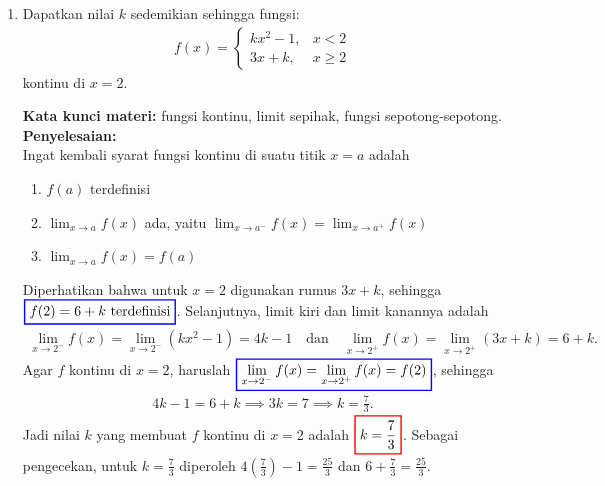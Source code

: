 \documentclass[10pt,openany,a4paper]{article}
\theoremstyle{definition}
\theoremstyle{definition}
\theoremstyle{plain}
\newenvironment{jawab}[2][tes]{%
\par\noindent\textbf{Kata kunci materi:} #1.\\
\textbf{Penyelesaian:} #2%
}{}
\begin{document}
\begin{enumerate}
    \item Dapatkan nilai $k$ sedemikian sehingga fungsi:
    \begin{align*}
        f(x)=\begin{cases}
            kx^2-1, & x<2\\
            3x+k, & x\geq 2
        \end{cases}
    \end{align*}
    kontinu di $x=2$.
    \begin{jawab}[fungsi kontinu, limit sepihak, fungsi sepotong-sepotong]{~\\
        Ingat kembali syarat fungsi kontinu di suatu titik \(x = a\) adalah
        \begin{enumerate}
            \item \(f(a)\) terdefinisi
            \item \(\displaystyle \lim_{x \to a} f(x)\) ada, yaitu $\displaystyle \lim_{x \to a^-} f(x) = \lim_{x \to a^+} f(x)$
            \item \(\displaystyle\lim_{x \to a} f(x) = f(a)\)
        \end{enumerate}
        Diperhatikan bahwa untuk $x=2$ digunakan rumus $3x+k$, sehingga $\colorlet{oldcolor}{.}
        \color{blue}
        \setlength{\fboxrule}{1pt} \boxed{\color{oldcolor}f(2) = 6+k~\text{terdefinisi}}\color{oldcolor}$. Selanjutnya, limit kiri dan limit kanannya adalah
        \begin{align*}
            \lim_{x\to 2^-} f(x) = \lim_{x\to 2^-} (kx^2-1) = 4k-1 \quad\text{dan}\quad \lim_{x\to 2^+} f(x) = \lim_{x\to 2^+} (3x+k) = 6+k.
        \end{align*}
        Agar $f$ kontinu di $x=2$, haruslah $\colorlet{oldcolor}{.}
        \color{blue}
        \setlength{\fboxrule}{1pt} \boxed{\color{oldcolor}\lim_{x\to 2^-} f(x) = \lim_{x\to 2^+} f(x) = f(2)}\color{oldcolor}$, sehingga
        \begin{align*}
            4k-1 = 6+k \implies 3k = 7 \implies k = \frac{7}{3}.
        \end{align*}
        Jadi nilai $k$ yang membuat $f$ kontinu di $x=2$ adalah $\colorlet{oldcolor}{.}
        \color{red}
        \setlength{\fboxrule}{1pt} \boxed{\color{oldcolor}k=\frac{7}{3}}\color{oldcolor}$. Sebagai pengecekan, untuk $k=\frac{7}{3}$ diperoleh $4\left(\frac{7}{3}\right)-1=\frac{25}{3}$ dan $6+\frac{7}{3}=\frac{25}{3}$.
    }
    \end{jawab}


\end{enumerate}
\end{document}
